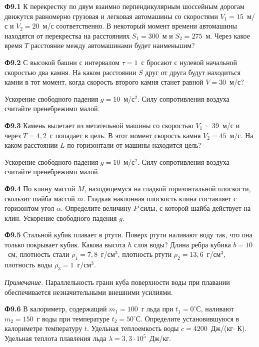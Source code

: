 \documentclass[12pt, a4paper, usenames]{article}
\begin{document}
{\bf Ф9.1} К перекрестку по двум взаимно перпендикулярным шоссейным дорогам движутся равномерно грузовая и легковая автомашины со скоростями $V_1 = 15$~м/с и $V_2 = 20$~м/с соответственно. В некоторый момент времени автомашины находятся от перекрестка на расстояниях $S_1 = 300$~м и $S_2 = 275$~м. Через какое время $T$ расстояние между автомашинами будет наименьшим? 

\bigskip

{\bf Ф9.2} С высокой башни с интервалом $\tau = 1$~с бросают с нулевой начальной скоростью два камня. На каком расстоянии $S$ друг от друга будут находиться камни в тот момент, когда скорость второго камня станет равной $V = 30$~м/с? 

Ускорение свободного падения $g = 10$~м/с$^2$. Силу сопротивления воздуха считайте пренебрежимо малой. 

\bigskip

{\bf Ф9.3} Камень вылетает из метательной машины со скоростью $V_1 = 39$~м/с и через $T = 4{,}2$~с попадает в цель. В этот момент скорость камня $V_2 = 45$~м/с. На каком  расстоянии $L$ по горизонтали от машины находится цель?

Ускорение свободного падения $g = 10$~м/с$^2$. Силу сопротивления воздуха считайте пренебрежимо малой. 

\bigskip

{\bf Ф9.4} По клину массой $M$, находящемуся на гладкой горизонтальной плоскости, скользит шайба массой $m$. Гладкая наклонная плоскость клина составляет с горизонтом угол $\alpha$. Определите величину $P$ силы, с которой шайба действует на клин. Ускорение свободного падения $g$. 

\bigskip

{\bf Ф9.5} Стальной кубик плавает в ртути. Поверх ртути наливают воду так, что она только покрывает кубик. Какова высота $h$ слоя воды? Длина ребра кубика $b = 10$~см,  плотность стали $\rho_1 = 7{,}8$~г/см$^3$, плотность ртути $\rho_2 = 13{,}6$~г/см$^3$,  плотность воды $\rho_3 = 1$~г/см$^3$.

\textit{Примечание.} Параллельность грани куба поверхности воды при плавании обеспечивается незначительными внешними усилиями.

\bigskip

{\bf Ф9.6} В калориметр, содержащий $m_1 = 100$~г льда при $t_1 = 0^\circ С$, наливают $m_2 = 150$~г воды при температуре $t_2 = 50^\circ С$. Определите установившуюся в калориметре температуру $t$.  Удельная  теплоемкость воды $c = 4200$~Дж/(кг$\cdot$ К). Удельная теплота плавления льда $\lambda = 3{,}3\cdot 10^5$~Дж/кг.
\end{document}
